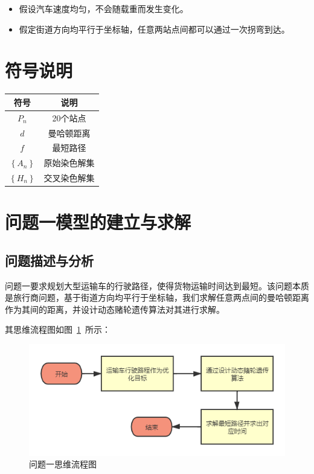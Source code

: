 \documentclass{whutmod}
\begin{document}
	\begin{itemize}                                             
		\item [(1)] 假设汽车速度均匀，不会随载重而发生变化。
		\item [(2)] 假定街道方向均平行于坐标轴，任意两站点间都可以通过一次拐弯到达。
	\end{itemize}
		
	\section{符号说明}
	\begin{table}[H]
	\label{biao} \centering
	\begin{tabular}{cc}
		\toprule[1.5pt]
		\multicolumn{1}{m{5cm}}{\centering 符号} & \multicolumn{1}{m{5cm}}{\centering 说明} \\
		\midrule[0.5pt]		
		$P_n$  & 20个站点  \\ 
		$d$  &  曼哈顿距离 \\ 
		$f$  &  最短路径\\
		$\left \{ A_n \right \}$  &  原始染色解集\\
		$\left \{ H_n \right \}$  & 交叉染色解集\\
		\bottomrule[1.5pt]
	\end{tabular}
\end{table}

	\section{问题一模型的建立与求解}
    \subsection{问题描述与分析}
问题一要求规划大型运输车的行驶路径，使得货物运输时间达到最短。该问题本质是旅行商问题，基于街道方向均平行于坐标轴，我们求解任意两点间的曼哈顿距离作为其间的距离，并设计动态赌轮遗传算法对其进行求解。


    其思维流程图如图~\ref{lct}~所示：

       \begin{figure}[H]
	   	\centering
	   	\includegraphics[width=\textwidth]{figures/abab.png}
	   	\caption{问题一思维流程图}\label{lct}
	   \end{figure}
\end{document}
